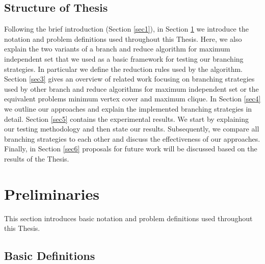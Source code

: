 \documentclass[]{article}
\begin{document}
\subsection{Structure of Thesis}

Following the brief introduction (Section \ref{sec1}), in Section \ref{sec2} we introduce the notation and problem definitions used throughout this Thesis. Here, we also explain the two variants of a branch and reduce algorithm for maximum independent set that we used as a basic framework for testing our branching strategies. In particular we define the reduction rules used by the algorithm.\\
Section \ref{sec3} gives an overview of related work focusing on branching strategies used by other branch and reduce algorithms for maximum independent set or the equivalent problems minimum vertex cover and maximum clique.
In Section \ref{sec4} we outline our approaches and explain the implemented branching strategies in detail. Section \ref{sec5} contains the experimental results. We start by explaining our testing methodology and then state our results. Subsequently, we compare all branching strategies to each other and discuss the effectiveness of our approaches. Finally, in Section \ref{sec6} proposals for future work will be discussed based on the results of the Thesis.

\section{Preliminaries} \label{sec2}

This section introduces basic notation and problem definitions used throughout this Thesis.

\subsection{Basic Definitions}
\end{document}
